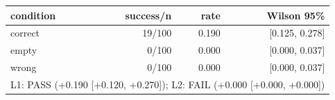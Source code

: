 \begin{tabular}{lrrr}
\toprule
condition & success/n & rate & Wilson 95\% \\
\midrule
correct & 19/100 & 0.190 & [0.125, 0.278] \\
empty & 0/100 & 0.000 & [0.000, 0.037] \\
wrong & 0/100 & 0.000 & [0.000, 0.037] \\
\midrule
\multicolumn{4}{l}{L1: PASS (+0.190 [+0.120, +0.270]); L2: FAIL (+0.000 [+0.000, +0.000])} \\
\bottomrule
\end{tabular}
